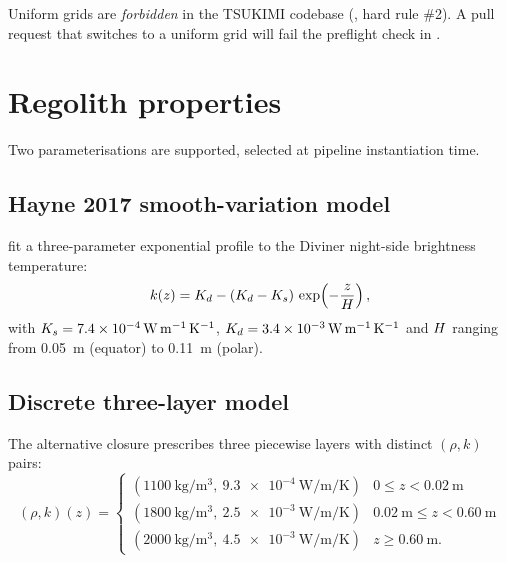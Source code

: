 \begin{warning}
Uniform grids are \emph{forbidden} in the TSUKIMI codebase
(, hard rule \#2).  A pull request that switches to a
uniform grid will fail the preflight check in
.
\end{warning}

\section{Regolith properties}

Two parameterisations are supported, selected at pipeline
instantiation time.

\subsection{Hayne 2017 smooth-variation model}

\citet{hayne2017} fit a three-parameter exponential profile to the
Diviner night-side brightness temperature:
\begin{equation}
  k(z) = K_{d} - (K_{d} - K_{s})\,\exp\!\left(-\frac{z}{H}\right),
  \label{eq:hayne_k}
\end{equation}
with $K_{s} = \SI{7.4e-4}{\watt\per\meter\per\kelvin}$,
$K_{d} = \SI{3.4e-3}{\watt\per\meter\per\kelvin}$ and $H$
ranging from \SI{0.05}{\meter} (equator) to \SI{0.11}{\meter} (polar).

\subsection{Discrete three-layer model}

The alternative closure \citep{mitchell2008} prescribes three piecewise
layers with distinct $(\rho, k)$ pairs:
\begin{equation}
  (\rho,k)(z) =
  \begin{cases}
    (\SI{1100}{\kilogram\per\meter\cubed},\ \SI{9.3e-4}{\watt\per\meter\per\kelvin}) & 0 \le z < \SI{0.02}{\meter} \\
    (\SI{1800}{\kilogram\per\meter\cubed},\ \SI{2.5e-3}{\watt\per\meter\per\kelvin}) & \SI{0.02}{\meter} \le z < \SI{0.60}{\meter} \\
    (\SI{2000}{\kilogram\per\meter\cubed},\ \SI{4.5e-3}{\watt\per\meter\per\kelvin}) & z \ge \SI{0.60}{\meter}.
  \end{cases}
  \label{eq:discrete_k}
\end{equation}

